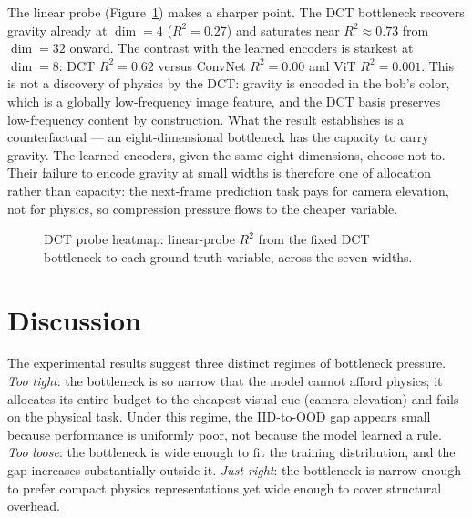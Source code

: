 \documentclass[letterpaper]{article} %
\begin{document}
The linear probe (Figure~\ref{fig:dct_probe}) makes a sharper point. The DCT bottleneck recovers gravity already at $\dim=4$ ($R^2=0.27$) and saturates near $R^2{\approx}0.73$ from $\dim=32$ onward. The contrast with the learned encoders is starkest at $\dim=8$: DCT $R^2=0.62$ versus ConvNet $R^2=0.00$ and ViT $R^2=0.001$. This is not a discovery of physics by the DCT: gravity is encoded in the bob's color, which is a globally low-frequency image feature, and the DCT basis preserves low-frequency content by construction. What the result establishes is a counterfactual --- an eight-dimensional bottleneck has the capacity to carry gravity. The learned encoders, given the same eight dimensions, choose not to. Their failure to encode gravity at small widths is therefore one of allocation rather than capacity: the next-frame prediction task pays for camera elevation, not for physics, so compression pressure flows to the cheaper variable.

\begin{figure}[t]
    \centering
    
    \caption{DCT probe heatmap: linear-probe $R^2$ from the fixed DCT
    bottleneck to each ground-truth variable, across the seven widths.}
    \label{fig:dct_probe}
\end{figure}

\section{Discussion}

The experimental results suggest three distinct regimes of bottleneck pressure. \emph{Too tight}: the bottleneck is so narrow that the model cannot afford physics; it allocates its entire budget to the cheapest visual cue (camera elevation) and fails on the physical task. Under this regime, the IID-to-OOD gap appears small because performance is uniformly poor, not because the model learned a rule. \emph{Too loose}: the bottleneck is wide enough to fit the training distribution, and the gap increases substantially outside it. \emph{Just right}: the bottleneck is narrow enough to prefer compact physics representations yet wide enough to cover structural overhead.
\end{document}
